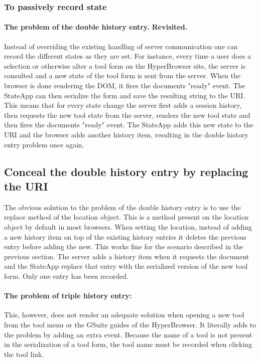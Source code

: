 \documentclass[english]{ifimaster}
\begin{document}
\subsubsection{To passively record state}
\paragraph{The problem of the double history entry. Revisited.}
Instead of overriding the existing handling of server communication one can record the different states as they are set. For instance, every time a user does a selection or otherwise alter a tool form on the HyperBrowser site, the server is consulted and a new state of the tool form is sent from the server. When the browser is done rendering the DOM, it fires the documents "ready" event. The StateApp can then serialize the form and save the resulting string to the URI. This means that for every state change the server first adds a session history, then requests the new tool state from the server, renders the new tool state and then fires the documents "ready" event. The StateApp adds this new state to the URI and the browser adds another history item, resulting in the double history entry problem once again. 

\subsection{Conceal the double history entry by replacing the URI}
The obvious solution to the problem of the double history entry is to use the replace method of the location object. This is a method present on the location object by default in most browsers. When setting the location, instead of adding a new history item on top of the existing history entries it deletes the previous entry before adding the new. This works fine for the scenario described in the previous section. The server adds a history item when it requests the document and the StateApp replace that entry with the serialized version of the new tool form. Only one entry has been recorded. 

\paragraph{The problem of triple history entry:}
This, however, does not render an adequate solution when opening a new tool from the tool menu or the GSuite guides of the HyperBrowser. It literally adds to the problem by adding an extra event. Because the name of a tool is not present in the serialization of a tool form, the tool name must be recorded when clicking the tool link. 
\end{document}
